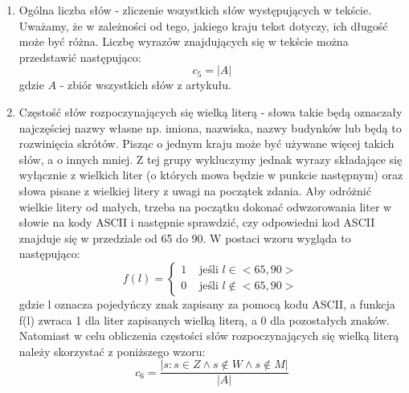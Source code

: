 \documentclass{classrep}
\newtheorem{exmp}{Przykład}[section]
\begin{document}
\begin{enumerate}
    \begin{exmp} Fragment artykułu pt. "Software services extends warrants" \cite{reuters} \\ \\
    \end{exmp} Daty występujące w tym fragmencie ("August 31" i "April 30") są zapisane w formacie: miesiąc dzień. Uważamy, że w zależności od tego, z jakiego kraju pochodzi artykuł format zapisu dat może się różnić. \\
    \item Ogólna liczba słów - zliczenie wszystkich słów występujących w tekście. Uważamy, że w zależności od tego, jakiego kraju tekst dotyczy, ich długość może być różna. Liczbę wyrazów znajdujących się w tekście można przedstawić następująco:
    \begin{equation}
        c_5 = |A|
    \end{equation}
    gdzie $A$ - zbiór wszystkich słów z artykułu. \\
    \item Częstość słów rozpoczynających się wielką literą - słowa takie będą oznaczały najczęściej  nazwy własne np. imiona, nazwiska, nazwy budynków lub będą to rozwinięcia skrótów. Pisząc o jednym kraju może być używane więcej takich słów, 
	a o innych mniej. Z tej grupy wykluczymy jednak wyrazy składające się wyłącznie z wielkich liter (o których mowa będzie w punkcie następnym) oraz słowa pisane z wielkiej litery z uwagi na początek zdania. Aby odróżnić wielkie litery od małych, trzeba na początku dokonać odwzorowania liter w słowie na kody ASCII i następnie sprawdzić, czy odpowiedni kod ASCII znajduje się w przedziale od 65 do 90. W postaci wzoru wygląda to następująco:
	\begin{equation}
	f(l) = \begin{cases} 1 &\mbox{ jeśli }  l\in<65,90> \\ 0 & \mbox{ jeśli } l\notin<65,90> \end{cases}
	\end{equation}
	gdzie l oznacza pojedyńczy znak zapisany za pomocą kodu ASCII, a funkcja f(l) zwraca 1 dla liter zapisanych wielką literą, a 0 dla pozostałych znaków.
	Natomiast w celu obliczenia częstości słów rozpoczynających się wielką literą należy skorzystać z poniższego wzoru: 
	\begin{equation}
        c_6 = \frac{|{s: s \in Z \land s \notin W \land s \notin M}|}{|A|}

\end{equation}
\end{enumerate}
\end{document}
